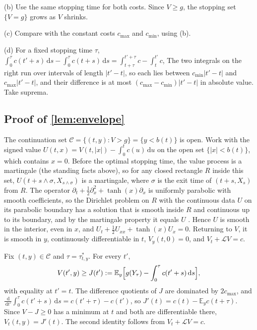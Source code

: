 \documentclass[11pt]{article}
\theoremstyle{definition}
\theoremstyle{remark}
\newcommand{\E}{\mathbb{E}}
\newcommand{\dd}{\,\mathrm{d}}
\newcommand{\Lop}{\mathcal{L}}
\begin{document}
(b) Use the same stopping time for both costs. Since $V \ge g$, the stopping set $\{V = g\}$ grows
as $V$ shrinks.

(c) Compare with the constant costs $c_{\max}$ and $c_{\min}$, using (b).

(d) For a fixed stopping time $\tau$,
$\int_0^\tau c(t'+s)\dd s - \int_0^\tau c(t+s)\dd s = \int_{t+\tau}^{t'+\tau} c - \int_t^{t'} c$,
The two integrals on the right run over intervals of length $|t' - t|$, so each lies between
$c_{\min}|t' - t|$ and $c_{\max}|t' - t|$, and their difference is at most
$(c_{\max} - c_{\min})|t' - t|$ in absolute value. Take suprema.

\subsection{Proof of \texorpdfstring{\cref{lem:envelope}}{Lemma }}

The continuation set $\mathcal C = \{(t, y) : V > g\} = \{y < b(t)\}$ is open. Work with the signed
value $U(t, x) = V(t, |x|) - \int_0^t c(u)\dd u$ on the open set $\{|x| < b(t)\}$, which contains
$x = 0$. Before the optimal stopping time, the value process is a martingale (the standing facts
above), so for any closed rectangle $R$ inside this set, $U(t + s \wedge \sigma, X_{s \wedge \sigma})$ is a martingale, where
$\sigma$ is the exit time of $(t + s, X_s)$ from $R$. The operator $\partial_t + \tfrac12
\partial_x^2 + \tanh(x)\partial_x$ is uniformly parabolic with smooth coefficients, so the
Dirichlet problem on $R$ with the continuous data $U$ on its parabolic boundary has a solution
that is smooth inside $R$ and continuous up to its boundary, and by the martingale property it
equals $U$ \citep[as in][Sec.~7.1]{peskir2006}. Hence $U$ is smooth in the interior, even
in $x$, and $U_t + \tfrac12 U_{xx} + \tanh(x)U_x = 0$. Returning to $V$, it is smooth in $y$,
continuously differentiable in $t$, $V_y(t, 0) = 0$, and $V_t + \Lop V = c$.

Fix $(t, y) \in \mathcal C$ and $\tau = \tau^*_{t,y}$. For every $t'$,
\begin{equation}
  V(t', y) \ge J(t') := \E_y\Bigl[g(Y_\tau) - \int_0^\tau c(t'+s)\dd s\Bigr],
\end{equation}
with equality at $t' = t$. The difference quotients of $J$ are dominated by $2c_{\max}$, and
$\frac{\dd}{\dd t'}\int_0^\tau c(t'+s)\dd s = c(t'+\tau) - c(t')$, so $J'(t) = c(t) - \E_y
c(t+\tau)$. Since $V - J \ge 0$ has a minimum at $t$ and both are differentiable there,
$V_t(t, y) = J'(t)$. The second identity follows from $V_t + \Lop V = c$.
\end{document}
